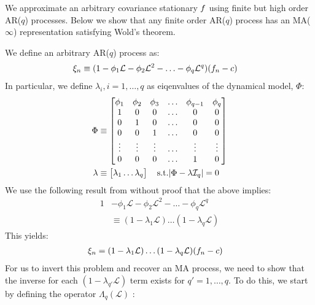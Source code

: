 We approximate an arbitrary covariance stationary $f$ using finite but high order AR($q$) processes. Below we show that any finite order AR($q$) process has an MA($\infty$) representation satisfying Wold's theorem.

We define an arbitrary AR($q$) process as:
\begin{align}
\xi_n & \equiv (1 - \phi_1 \mathcal{L}  - \phi_2 \mathcal{L} ^2 - \hdots -\phi_q \mathcal{L} ^q) (f_n - c)
\end{align}
In particular, we define $\lambda_i, i = 1, \hdots, q$ as eiqenvalues of the dynamical model, $\Phi$:
\begin{align}
\Phi &\equiv \begin{bmatrix} \phi_1 & \phi_2 & \phi_3 & \hdots & \phi_{q-1}  &\phi_q \\
1 & 0 & 0 & \hdots & 0 & 0 \\
0 & 1 & 0 & \hdots & 0 & 0 \\
0 & 0 & 1 & \hdots & 0 & 0 \\
\vdots & \vdots & \vdots & \hdots & \vdots & \vdots \\
0 & 0 & 0 & \hdots & 1 & 0 \\
 \end{bmatrix} \\
\bf{\lambda} & \equiv \begin{bmatrix} \lambda_1 \dots \lambda_q \end{bmatrix} \quad \text{s.t.} |\Phi - \lambda\mathcal{I}_q|  = 0 \\
\end{align}
We use the following result from \cite{hamilton1994time} without proof that the above implies:
\begin{align}
1 & - \phi_1 \mathcal{L}  - \phi_2 \mathcal{L}^2 - \hdots -\phi_q \mathcal{L}^q \\
&\equiv (1 - \lambda_1\mathcal{L}) \hdots (1 - \lambda_q \mathcal{L}) 
\end{align}
This yields:
\begin{align}
\xi_n & = (1 - \lambda_1 \mathcal{L}) \hdots (1 - \lambda_q \mathcal{L}) (f_n - c) \label{eqn:app:ARMA:ar_p_1}
\end{align}
For us to invert this problem and recover an MA process, we need to show that the inverse for each $(1 - \lambda_{q'} \mathcal{L})$ term exists for $q' = 1, \hdots, q$. To do this, we start by defining the operator $\Lambda_q(\mathcal{L}) $ :
